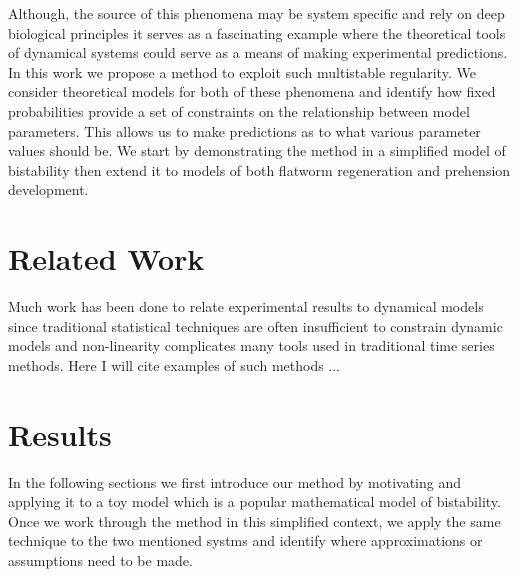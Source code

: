 \documentclass[letterpaper]{article}
\begin{document}
Although, the source of this phenomena may be system specific and rely on deep
biological principles it serves as a fascinating example where the theoretical 
tools of dynamical systems could serve as a means of making experimental predictions.
In this work we propose a method to exploit such multistable regularity. We consider
theoretical models for both of these phenomena and identify how fixed 
probabilities provide a set of constraints on the relationship between model
parameters. This allows us to make predictions as to what various parameter 
values should be. We start by demonstrating the method in a simplified model
of bistability  then extend it to models of both flatworm regeneration and
prehension development.
\section{Related Work}
Much work has been done to relate experimental results to dynamical
models since traditional statistical techniques are often insufficient 
to constrain dynamic models and non-linearity complicates many tools used 
in traditional time series methods. Here I will cite examples of such
methods $\ldots$
\section{Results}
In the following sections we first introduce our method by motivating
and applying it to a toy model which is a popular mathematical model
of bistability. Once we work through the method in this simplified 
context, we apply the same technique to the two mentioned systms and 
identify where approximations or assumptions need to be made.
\end{document}
